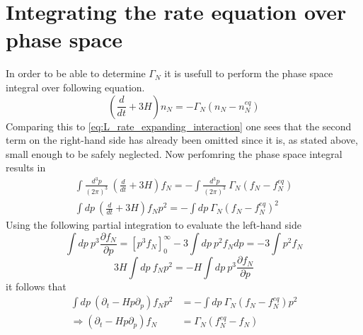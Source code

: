\section{Integrating the rate equation over phase space}
\label{ap:phase_space}
In order to be able to determine $\Gamma_N$ it is usefull to perform the phase space integral over following equation. 
\begin{equation*}
\left(\frac{d}{dt}+3H\right)n_N=-\Gamma_N\left(n_N-n_N^{eq}\right)
\end{equation*}
Comparing this to \ref{eq:L_rate_expanding_interaction} one sees that the second term on the right-hand side has already been omitted since it is, as stated above, small enough to be safely neglected. \newline
Now perfomring the phase space integral results in
\begin{align*}
\int\frac{d^3p}{\left(2\pi\right)^3}\: \left(\frac{d}{dt}+3H\right)f_N=-\int\frac{d^3p}{\left(2\pi\right)^3}\:\Gamma_N\left(f_N-f_N^{eq}\right)\\
\int dp\: \left(\frac{d}{dt}+3H\right)f_Np^2=-\int dp\:\Gamma_N\left(f_N-f_N^{eq}\right)^2
\end{align*}
Using the following partial integration to evaluate the left-hand side
\begin{equation*}
\int dp\:p^3\frac{\partial f_N}{\partial p}=\left[p^3f_N\right]_0^\infty-3\int dp\:p^2f_Ndp=-3\int p^2f_N
\end{equation*}
\begin{equation*}
3H\int dp\: f_Np^2=-H\int dp\: p^3\frac{\partial f_N}{\partial p}
\end{equation*}
it follows that
\begin{align*}
\int  dp\:\left(\partial_t-Hp\partial_p\right)f_Np^2&=-\int dp\:\Gamma_N\left(f_N-f_N^{eq}\right)p^2\\
\Rightarrow \left(\partial_t-Hp\partial_p\right)f_N&=\Gamma_N\left(f_N^{eq}-f_N\right)
\end{align*}
